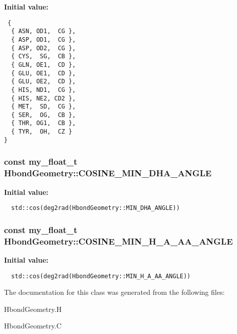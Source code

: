 \textbf{Initial value:}

\begin{Code}\begin{verbatim} {
  { ASN, OD1,  CG },
  { ASP, OD1,  CG },
  { ASP, OD2,  CG },
  { CYS,  SG,  CB },
  { GLN, OE1,  CD },
  { GLU, OE1,  CD },
  { GLU, OE2,  CD },
  { HIS, ND1,  CG },  
  { HIS, NE2, CD2 },  
  { MET,  SD,  CG },  
  { SER,  OG,  CB },
  { THR, OG1,  CB },
  { TYR,  OH,  CZ }
}
\end{verbatim}\end{Code}
\subsubsection{\setlength{\rightskip}{0pt plus 5cm}const my\_\-float\_\-t Hbond\-Geometry::COSINE\_\-MIN\_\-DHA\_\-ANGLE\hspace{0.3cm}{\tt  [static, private]}}\label{classASCbase_1_1HbondGeometry_7aa28706a8d3851bfd42ad2f6e159d72}


\textbf{Initial value:}

\begin{Code}\begin{verbatim} 
  std::cos(deg2rad(HbondGeometry::MIN_DHA_ANGLE))
\end{verbatim}\end{Code}
\subsubsection{\setlength{\rightskip}{0pt plus 5cm}const my\_\-float\_\-t Hbond\-Geometry::COSINE\_\-MIN\_\-H\_\-A\_\-AA\_\-ANGLE\hspace{0.3cm}{\tt  [static, private]}}\label{classASCbase_1_1HbondGeometry_228f234e37eba913cebf3cdfa004c590}


\textbf{Initial value:}

\begin{Code}\begin{verbatim} 
  std::cos(deg2rad(HbondGeometry::MIN_H_A_AA_ANGLE))
\end{verbatim}\end{Code}


The documentation for this class was generated from the following files:\begin{CompactItemize}
\item 
Hbond\-Geometry.H\item 
Hbond\-Geometry.C\end{CompactItemize}
